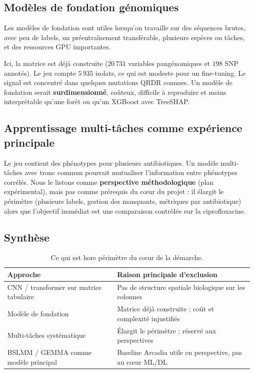 \documentclass[11pt,a4paper]{article}
\begin{document}
\subsection{Modèles de fondation génomiques}

Les modèles de fondation sont utiles lorsqu'on travaille sur des séquences brutes, avec peu de labels, un préentraînement transférable, plusieurs espèces ou tâches, et des ressources GPU importantes.

Ici, la matrice est déjà construite ($20\,731$ variables pangénomiques et $198$ SNP annotés). Le jeu compte $5\,935$ isolats, ce qui est modeste pour un fine-tuning. Le signal est concentré dans quelques mutations QRDR connues. Un modèle de fondation serait \textbf{surdimensionné}, coûteux, difficile à reproduire et moins interprétable qu'une forêt ou qu'un XGBoost avec TreeSHAP.

\subsection{Apprentissage multi-tâches comme expérience principale}

Le jeu contient des phénotypes pour plusieurs antibiotiques. Un modèle multi-tâches avec tronc commun pourrait mutualiser l'information entre phénotypes corrélés. Nous le listons comme \textbf{perspective méthodologique} (plan expérimental), mais pas comme prérequis du cœur du projet : il élargit le périmètre (plusieurs labels, gestion des manquants, métriques par antibiotique) alors que l'objectif immédiat est une comparaison contrôlée sur la ciprofloxacine.

\subsection{Synthèse}

\begin{table}[H]
\centering
\caption{Ce qui est hors périmètre du cœur de la démarche.}
\label{tab:hors-perimetre}
\begin{tabularx}{\textwidth}{lX}
\toprule
\textbf{Approche} & \textbf{Raison principale d'exclusion} \\
\midrule
CNN / transformer sur matrice tabulaire & Pas de structure spatiale biologique sur les colonnes \\
Modèle de fondation & Matrice déjà construite ; coût et complexité injustifiés \\
Multi-tâches systématique & Élargit le périmètre ; réservé aux perspectives \\
BSLMM / GEMMA comme modèle principal & Baseline Arcadia utile en perspective, pas au cœur ML/DL \\
\bottomrule
\end{tabularx}
\end{table}
\end{document}
